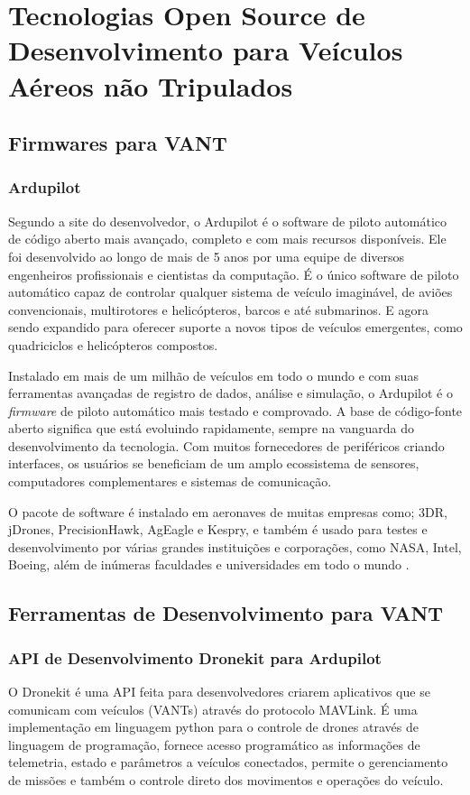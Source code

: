 \section{Tecnologias Open Source de Desenvolvimento para Veículos Aéreos não Tripulados}

\subsection{Firmwares para VANT}

\subsubsection{Ardupilot}
Segundo a site do desenvolvedor, o Ardupilot é o software de piloto automático de código aberto mais avançado, completo e com mais recursos disponíveis. Ele foi desenvolvido ao longo de mais de 5 anos por uma equipe de diversos engenheiros profissionais e cientistas da computação. É o único software de piloto automático capaz de controlar qualquer sistema de veículo imaginável, de aviões convencionais, multirotores e helicópteros, barcos e até submarinos. E agora sendo expandido para oferecer suporte a novos tipos de veículos emergentes, como quadriciclos e helicópteros compostos.

Instalado em mais de um milhão de veículos em todo o mundo e com suas ferramentas avançadas de registro de dados, análise e simulação, o Ardupilot é o \textit{firmware} de piloto automático mais testado e comprovado. A base de código-fonte aberto significa que está evoluindo rapidamente, sempre na vanguarda do desenvolvimento da tecnologia. Com muitos fornecedores de periféricos criando interfaces, os usuários se beneficiam de um amplo ecossistema de sensores, computadores complementares e sistemas de comunicação.

O pacote de software é instalado em aeronaves de muitas empresas como; 3DR, jDrones, PrecisionHawk, AgEagle e Kespry, e também é usado para testes e desenvolvimento por várias grandes instituições e corporações, como NASA, Intel, Boeing, além de inúmeras faculdades e universidades em todo o mundo \cite{quatorze}.

\subsection{Ferramentas de Desenvolvimento para VANT}

\subsubsection{API de Desenvolvimento Dronekit para Ardupilot}
O Dronekit é uma API feita para desenvolvedores criarem aplicativos que se comunicam com veículos (VANTs) através do protocolo MAVLink. É uma implementação em linguagem python para o controle de drones através de linguagem de programação, fornece acesso programático as informações de telemetria, estado e parâmetros a veículos conectados, permite o gerenciamento de missões e também o controle direto dos movimentos e operações do veículo.

